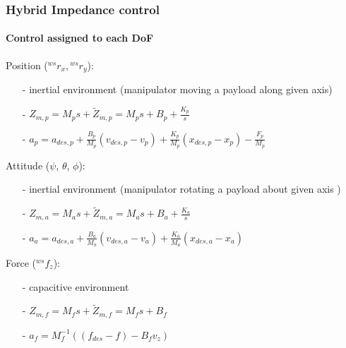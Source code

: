 \begin{frame}
  \frametitle{Hybrid Impedance control}
  \framesubtitle{Control assigned to each DoF}
  Position (${}^{ws}r_x,{}^{ws}r_y$):
  \begin{itemize}
  \item[-] inertial environment (manipulator moving a payload along given axis)
  \item[-] $Z_{m,p} = M_p s + \tilde{Z}_{m,p} = M_p s + B_p + \frac{K_p}{s}$
  \item[-] $a_{p} = a_{des,p} + \frac{B_p}{M_p} (v_{des,p} - v_p) + \frac{K_p}{M_p} (x_{des,p} - x_p) - \frac{F_p}{M_p}$
  \end{itemize}
  Attitude ($\psi$, $\theta$, $\phi$):
  \begin{itemize}
  \item[-] inertial environment (manipulator rotating a payload about given axis )
  \item[-] $Z_{m,a} = M_a s + \tilde{Z}_{m,a} = M_a s + B_a + \frac{K_a}{s}$
  \item[-] $a_a = a_{des,a} + \frac{B_a}{M_a} (v_{des,a} - v_a) + \frac{K_a}{M_a} (x_{des,a} - x_a)$
  \end{itemize}
  Force (${}^{ws}f_z$):
  \begin{itemize}
  \item[-] capacitive environment
  \item[-] $Z_{m,f} = M_f s + \tilde{Z}_{m,f} = M_f s + B_f$
  \item[-] $a_{f} = M_f^{-1}((f_{des} - f) - B_f v_z)$
  \end{itemize}  
\end{frame}

